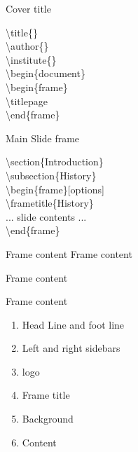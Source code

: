 \documentclass[10pt,blue,xcolor=pdftex,dvipsnames,table,handout]{beamer}
\begin{document}

		\begin{frame}{Cover title}

			\textbackslash title\{\} \\
			\textbackslash author\{\} \\
			\textbackslash institute\{\} \\ 

			\textbackslash begin\{document\} \\
			\textbackslash begin\{frame\} \\
			\textbackslash titlepage  \\
			\textbackslash end\{frame\}  \\

		\end{frame}



		\begin{frame}{Main Slide frame}

			\textbackslash section\{Introduction\} \\
			\textbackslash subsection\{History\} \\
			\textbackslash begin\{frame\}[options] \\
			\textbackslash frametitle\{History\} \\
			... slide contents ... \\
			\textbackslash end\{frame\}  \\

		\end{frame}


		\begin{frame}[plain]{Frame content}
			Frame content
		\end{frame}

		\begin{frame}{Frame content}

			\begin{block} {Frame content}
			\begin{enumerate}
			\item Head Line and foot line
			\item Left and right sidebars
			\item logo
			\item Frame title
			\item Background
			\item Content
			\end{enumerate}
			\end{block}

		\end{frame}
\end{document}
